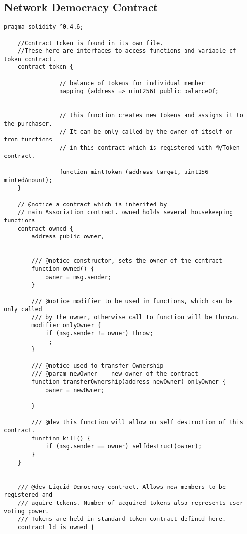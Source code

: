 \documentclass{article}
\begin{document}
\subsection { Network Democracy Contract}

\begin{lstlisting}[style=MyCStyle]
     pragma solidity ^0.4.6;

    //Contract token is found in its own file.
    //These here are interfaces to access functions and variable of token contract.
    contract token {

                // balance of tokens for individual member
                mapping (address => uint256) public balanceOf;


                // this function creates new tokens and assigns it to the purchaser.
                // It can be only called by the owner of itself or from functions
                // in this contract which is registered with MyToken contract.

                function mintToken (address target, uint256 mintedAmount);
    }

    // @notice a contract which is inherited by
    // main Association contract. owned holds several housekeeping functions
    contract owned {
        address public owner;


        /// @notice constructor, sets the owner of the contract
        function owned() {
            owner = msg.sender;
        }

        /// @notice modifier to be used in functions, which can be only called
        /// by the owner, otherwise call to function will be thrown.
        modifier onlyOwner {
            if (msg.sender != owner) throw;
            _;
        }

        /// @notice used to transfer Ownership
        /// @param newOwner  - new owner of the contract
        function transferOwnership(address newOwner) onlyOwner {
            owner = newOwner;

        }

        /// @dev this function will allow on self destruction of this contract.
        function kill() {
            if (msg.sender == owner) selfdestruct(owner);
        }
    }


    /// @dev Liquid Democracy contract. Allows new members to be registered and
    /// aquire tokens. Number of acquired tokens also represents user voting power.
    /// Tokens are held in standard token contract defined here.
    contract ld is owned {


\end{lstlisting}
\end{document}
